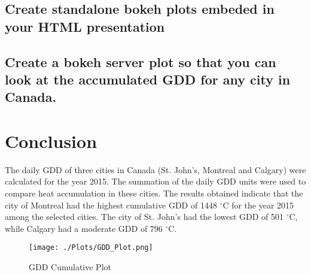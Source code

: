 \documentclass{article}
\begin{document}
\subsection{Create standalone bokeh plots embeded in your HTML presentation}
\subsection{Create a bokeh server plot so that you can look at the accumulated GDD for any city in Canada.}



\section{Conclusion}
The daily GDD of three cities in Canada (St. John's, Montreal and Calgary) were calculated for the year 2015. The summation of the daily GDD units were used to compare heat accumulation in these cities. The results obtained indicate that the city of Montreal had the highest cumulative GDD of 1448 $^{\circ}$C for the year 2015 among the selected cities. The city of St. John's had the lowest GDD of 501 $^{\circ}$C, while Calgary had a moderate GDD of 796 $^{\circ}$C.




\begin{figure}[h!]
\centering
\texttt{[image: ./Plots/GDD\_Plot.png]}
\caption{GDD Cumulative Plot}
\label{fig: GDD Plot}
\end{figure}
\end{document}
